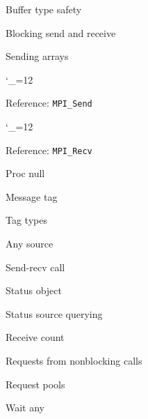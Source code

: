 \documentclass[10pt]{beamer}
\newcommand\referenceframe{\begingroup\catcode`\_=12 \referenceframett}
\gdef\referenceframett#1{
  \begin{numberedframe}{Reference: \texttt{MPI_#1}}
    \small
    
  \end{numberedframe}\endgroup}
\begin{document}
\begin{numberedframe}{Buffer type safety}
  
\end{numberedframe}
\begin{numberedframe}{Blocking send and receive}
  
\end{numberedframe}
\begin{numberedframe}{Sending arrays}
  
\end{numberedframe}
\referenceframe{Send}
\referenceframe{Recv}
\begin{numberedframe}{Proc null}
  
\end{numberedframe}
\begin{numberedframe}{Message tag}
  
\end{numberedframe}
\begin{numberedframe}{Tag types}
  
\end{numberedframe}
\begin{numberedframe}{Any source}
  
\end{numberedframe}
\begin{numberedframe}{Send-recv call}
  
\end{numberedframe}
\begin{numberedframe}{Status object}
  
\end{numberedframe}
\begin{numberedframe}{Status source querying}
  
\end{numberedframe}
\begin{numberedframe}{Receive count}
  
\end{numberedframe}

\begin{numberedframe}{Requests from nonblocking calls}
  
\end{numberedframe}
\begin{numberedframe}{Request pools}
  
\end{numberedframe}
\begin{numberedframe}{Wait any}
  
\end{numberedframe}
\begin{exerciseframe}[setdiff]
  
\end{exerciseframe}
\end{document}
